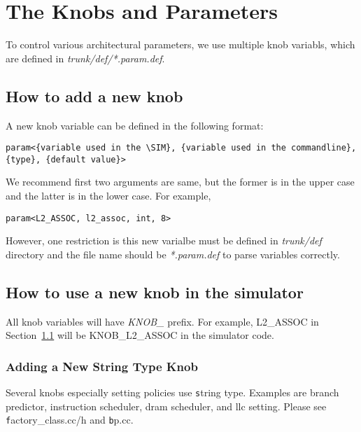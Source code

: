 

\chapter{The Knobs and Parameters}
\label{sec:knob}

To control various architectural parameters, we use multiple knob
variabls, which are defined in \textit{trunk/def/*.param.def}.

\section{How to add a new knob}
\label{sec:knob1}

A new knob variable can be defined in the following format:

\begin{Verbatim}
param<{variable used in the \SIM}, {variable used in the commandline}, {type}, {default value}>
\end{Verbatim}

We recommend first two arguments are same, but the former is in the
upper case and the latter is in the lower case. For example,

\begin{Verbatim}
param<L2_ASSOC, l2_assoc, int, 8>
\end{Verbatim}


However, one restriction is this new varialbe must be defined
in \textit{trunk/def} directory and the file name should
be \textit{*.param.def} to parse variables correctly.


\section{How to use a new knob in the simulator}

All knob variables will have \textit{KNOB\_} prefix. For example,
L2\_ASSOC in Section~\ref{sec:knob1} will be KNOB\_L2\_ASSOC in the
simulator code.

\subsection{Adding a New String Type Knob}
Several knobs especially setting policies use {\texttt string} type. 
Examples are branch predictor, instruction scheduler, dram scheduler, and llc setting. Please see {\texttt factory\_class.cc/h} and {\texttt bp.cc}. 





